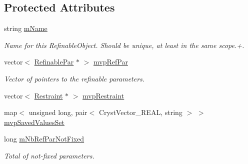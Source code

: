 \subsection*{Protected Attributes}
\begin{DoxyCompactItemize}
\item 
\mbox{\label{class_obj_cryst_1_1_refinable_obj_ad8ddc8c4b3daae8649986d7febc5fca4}} 
string \mbox{\hyperlink{class_obj_cryst_1_1_refinable_obj_ad8ddc8c4b3daae8649986d7febc5fca4}{m\+Name}}
\begin{DoxyCompactList}\small\item\em Name for this Refinable\+Object. Should be unique, at least in the same scope.+. \end{DoxyCompactList}\item 
\mbox{\label{class_obj_cryst_1_1_refinable_obj_ae05556c30ef2d6818c22750c89690fc9}} 
vector$<$ \mbox{\hyperlink{class_obj_cryst_1_1_refinable_par}{Refinable\+Par}} $\ast$ $>$ \mbox{\hyperlink{class_obj_cryst_1_1_refinable_obj_ae05556c30ef2d6818c22750c89690fc9}{mvp\+Ref\+Par}}
\begin{DoxyCompactList}\small\item\em Vector of pointers to the refinable parameters. \end{DoxyCompactList}\item 
vector$<$ \mbox{\hyperlink{class_obj_cryst_1_1_restraint}{Restraint}} $\ast$ $>$ \mbox{\hyperlink{class_obj_cryst_1_1_refinable_obj_ad3b06da1eb64191be95934c097829efc}{mvp\+Restraint}}
\item 
map$<$ unsigned long, pair$<$ Cryst\+Vector\+\_\+\+R\+E\+AL, string $>$ $>$ \mbox{\hyperlink{class_obj_cryst_1_1_refinable_obj_a22adaed8c98377e45800e5d8624531a2}{mvp\+Saved\+Values\+Set}}
\item 
\mbox{\label{class_obj_cryst_1_1_refinable_obj_a8cffff9a5b5d2a76bd9e29cce5f4700e}} 
long \mbox{\hyperlink{class_obj_cryst_1_1_refinable_obj_a8cffff9a5b5d2a76bd9e29cce5f4700e}{m\+Nb\+Ref\+Par\+Not\+Fixed}}
\begin{DoxyCompactList}\small\item\em Total of not-\/fixed parameters. \end{DoxyCompactList}\item 
\mbox{\label{class_obj_cryst_1_1_refinable_obj_a359f6599fdaa11ea01afd91289265bac}} 

\end{DoxyCompactItemize}
